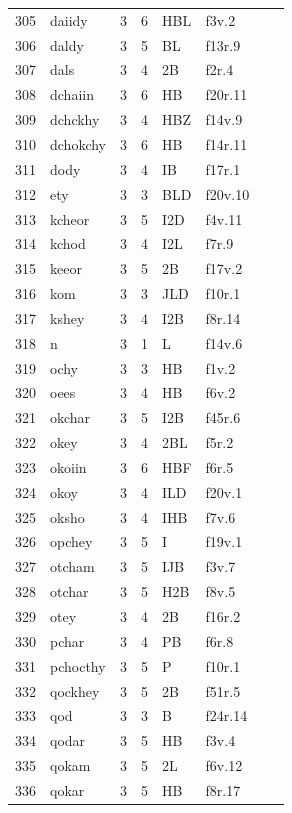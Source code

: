 \documentclass[11pt,a4paper]{article}
\begin{document}
\begin{landscape}
\begin{longtable}{@{}r>{\ttfamily}lrrl>{\ttfamily}l>{\raggedright\arraybackslash}p{80mm}>{\raggedright\arraybackslash}p{36mm}@{}}
305 & daiidy & 3 & 6 & HBL & f3v.2 &  & \\
306 & daldy & 3 & 5 & BL & f13r.9 &  & \\
307 & dals & 3 & 4 & 2B & f2r.4 &  & \\
308 & dchaiin & 3 & 6 & HB & f20r.11 &  & \\
309 & dchckhy & 3 & 4 & HBZ & f14v.9 &  & \\
310 & dchokchy & 3 & 6 & HB & f14r.11 &  & \\
311 & dody & 3 & 4 & IB & f17r.1 &  & \\
312 & ety & 3 & 3 & BLD & f20v.10 &  & \\
313 & kcheor & 3 & 5 & I2D & f4v.11 &  & \\
314 & kchod & 3 & 4 & I2L & f7r.9 &  & \\
315 & keeor & 3 & 5 & 2B & f17v.2 &  & \\
316 & kom & 3 & 3 & JLD & f10r.1 &  & \\
317 & kshey & 3 & 4 & I2B & f8r.14 &  & \\
318 & n & 3 & 1 & L & f14v.6 &  & \\
319 & ochy & 3 & 3 & HB & f1v.2 &  & \\
320 & oees & 3 & 4 & HB & f6v.2 &  & \\
321 & okchar & 3 & 5 & I2B & f45r.6 &  & \\
322 & okey & 3 & 4 & 2BL & f5r.2 &  & \\
323 & okoiin & 3 & 6 & HBF & f6r.5 &  & \\
324 & okoy & 3 & 4 & ILD & f20v.1 &  & \\
325 & oksho & 3 & 4 & IHB & f7v.6 &  & \\
326 & opchey & 3 & 5 & I & f19v.1 &  & \\
327 & otcham & 3 & 5 & IJB & f3v.7 &  & \\
328 & otchar & 3 & 5 & H2B & f8v.5 &  & \\
329 & otey & 3 & 4 & 2B & f16r.2 &  & \\
330 & pchar & 3 & 4 & PB & f6r.8 &  & \\
331 & pchocthy & 3 & 5 & P & f10r.1 &  & \\
332 & qockhey & 3 & 5 & 2B & f51r.5 &  & \\
333 & qod & 3 & 3 & B & f24r.14 &  & \\
334 & qodar & 3 & 5 & HB & f3v.4 &  & \\
335 & qokam & 3 & 5 & 2L & f6v.12 &  & \\
336 & qokar & 3 & 5 & HB & f8r.17 &  & \\

\end{longtable}
\end{landscape}
\end{document}
